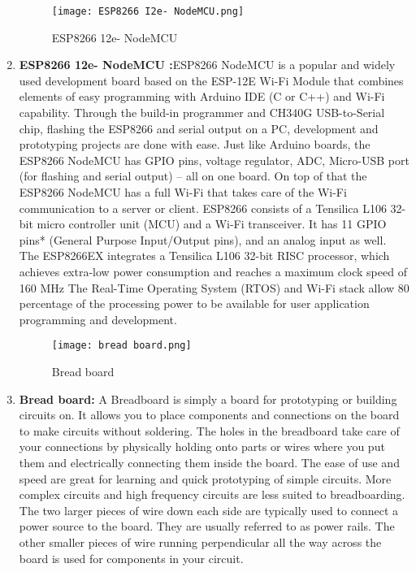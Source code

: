 \documentclass[12pt,letterpaper]{article}
\begin{document}
\begin{enumerate}
    \begin{figure}[h!]
        \centering
        \texttt{[image: ESP8266 I2e- NodeMCU.png]}
        \caption{ESP8266 12e- NodeMCU}
        \label{fig:image3}
    \end{figure}
    \item \textbf{ESP8266 12e- NodeMCU :}ESP8266 NodeMCU is a popular and widely used development board based on the ESP-12E Wi-Fi Module that combines elements of easy programming with Arduino IDE (C or C++) and Wi-Fi capability. Through the build-in programmer and CH340G USB-to-Serial chip, flashing the ESP8266 and serial output on a PC, development and prototyping projects are done with ease. Just like Arduino boards, the ESP8266 NodeMCU has GPIO pins, voltage regulator, ADC, Micro-USB port (for flashing and serial output) – all on one board. On top of that the ESP8266 NodeMCU has a full Wi-Fi that takes care of the Wi-Fi communication to a server or client. ESP8266 consists of a Tensilica L106 32-bit micro controller unit (MCU) and a Wi-Fi transceiver. It has 11 GPIO pins* (General Purpose Input/Output pins), and an analog input as well. The ESP8266EX integrates a Tensilica L106 32-bit RISC processor, which achieves extra-low power consumption and reaches a maximum clock speed of 160 MHz The Real-Time Operating System (RTOS) and Wi-Fi stack allow 80 percentage of the processing power to be available for user application programming and development.
    
    \begin{figure}[h!]
        \centering
        \texttt{[image: bread board.png]}
        \caption{Bread board}
        \label{fig:image3}
    \end{figure}
    \item \textbf{Bread board: }A Breadboard is simply a board for prototyping or building circuits on. It allows you to place components and connections on the board to make circuits without soldering. The holes in the breadboard take care of your connections by physically holding onto parts or wires where you put them and electrically connecting them inside the board. The ease of use and speed are great for learning and quick prototyping of simple circuits. More complex circuits and high frequency circuits are less suited to breadboarding. The two larger pieces of wire down each side are typically used to connect a power source to the board. They are usually referred to as power rails. The other smaller pieces of wire running perpendicular all the way across the board is used for components in your circuit.
    

\end{enumerate}
\end{document}
